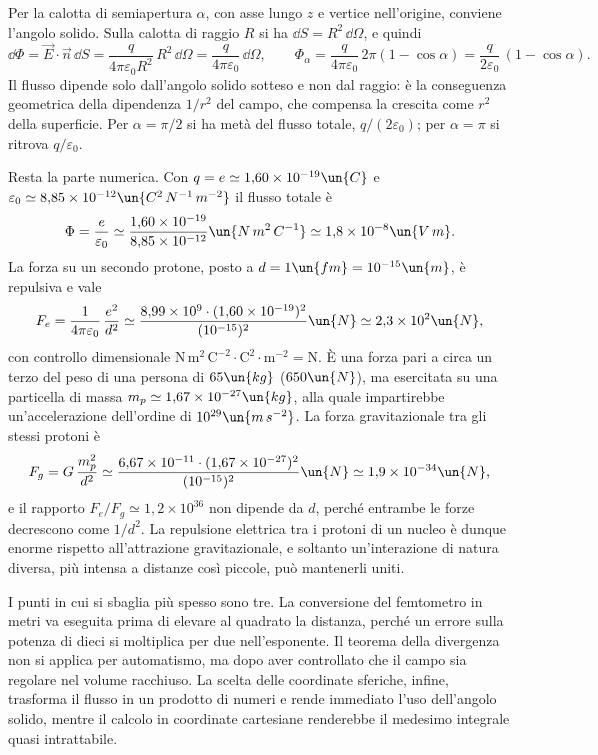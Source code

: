 \documentclass[main.tex]{subfiles}
\begin{document}
Per la calotta di semiapertura $\alpha$, con asse lungo $z$ e vertice nell'origine, conviene l'angolo solido. Sulla calotta di raggio $R$ si ha $\dd S=R^2\,\dd\Omega$, e quindi
\[
\dd\Phi=\vec E\cdot\vec n\,\dd S=\frac{q}{4\pi\varepsilon_0R^2}\,R^2\,\dd\Omega=\frac{q}{4\pi\varepsilon_0}\,\dd\Omega,\qquad
\Phi_\alpha=\frac{q}{4\pi\varepsilon_0}\,2\pi(1-\cos\alpha)=\frac{q}{2\varepsilon_0}\,(1-\cos\alpha).
\]
Il flusso dipende solo dall'angolo solido sotteso e non dal raggio: è la conseguenza geometrica della dipendenza $1/r^2$ del campo, che compensa la crescita come $r^2$ della superficie. Per $\alpha=\pi/2$ si ha metà del flusso totale, $q/(2\varepsilon_0)$; per $\alpha=\pi$ si ritrova $q/\varepsilon_0$.

Resta la parte numerica. Con $q=e\simeq1{,}60\times10^{-19}\un{C}$ e $\varepsilon_0\simeq8{,}85\times10^{-12}\un{C^2\,N^{-1}\,m^{-2}}$ il flusso totale è
\[
\Phi=\frac{e}{\varepsilon_0}\simeq\frac{1{,}60\times10^{-19}}{8{,}85\times10^{-12}}\un{N\,m^2\,C^{-1}}\simeq1{,}8\times10^{-8}\un{V\,m}.
\]
La forza su un secondo protone, posto a $d=1\un{fm}=10^{-15}\un{m}$, è repulsiva e vale
\[
F_e=\frac{1}{4\pi\varepsilon_0}\,\frac{e^2}{d^2}\simeq\frac{8{,}99\times10^{9}\cdot(1{,}60\times10^{-19})^2}{(10^{-15})^2}\un{N}\simeq2{,}3\times10^{2}\un{N},
\]
con controllo dimensionale $\mathrm{N\,m^2\,C^{-2}}\cdot\mathrm{C^2}\cdot\mathrm{m^{-2}}=\mathrm{N}$. È una forza pari a circa un terzo del peso di una persona di $65\un{kg}$ ($650\un{N}$), ma esercitata su una particella di massa $m_p\simeq1{,}67\times10^{-27}\un{kg}$, alla quale impartirebbe un'accelerazione dell'ordine di $10^{29}\un{m\,s^{-2}}$. La forza gravitazionale tra gli stessi protoni è
\[
F_g=G\,\frac{m_p^2}{d^2}\simeq\frac{6{,}67\times10^{-11}\cdot(1{,}67\times10^{-27})^2}{(10^{-15})^2}\un{N}\simeq1{,}9\times10^{-34}\un{N},
\]
e il rapporto $F_e/F_g\simeq1{,}2\times10^{36}$ non dipende da $d$, perché entrambe le forze decrescono come $1/d^2$. La repulsione elettrica tra i protoni di un nucleo è dunque enorme rispetto all'attrazione gravitazionale, e soltanto un'interazione di natura diversa, più intensa a distanze così piccole, può mantenerli uniti.

I punti in cui si sbaglia più spesso sono tre. La conversione del femtometro in metri va eseguita prima di elevare al quadrato la distanza, perché un errore sulla potenza di dieci si moltiplica per due nell'esponente. Il teorema della divergenza non si applica per automatismo, ma dopo aver controllato che il campo sia regolare nel volume racchiuso. La scelta delle coordinate sferiche, infine, trasforma il flusso in un prodotto di numeri e rende immediato l'uso dell'angolo solido, mentre il calcolo in coordinate cartesiane renderebbe il medesimo integrale quasi intrattabile.
\end{document}
